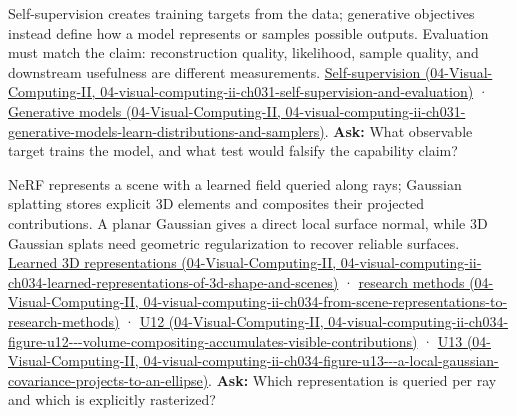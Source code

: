 Self-supervision creates training targets from the data; generative objectives instead define how a model represents or samples possible outputs. Evaluation must match the claim: reconstruction quality, likelihood, sample quality, and downstream usefulness are different measurements. \href{../04-Visual-Computing-II/main.pdf\#nameddest=04-visual-computing-ii-ch031-self-supervision-and-evaluation}{Self-supervision (04-Visual-Computing-II, 04-visual-computing-ii-ch031-self-supervision-and-evaluation)} · \href{../04-Visual-Computing-II/main.pdf\#nameddest=04-visual-computing-ii-ch031-generative-models-learn-distributions-and-samplers}{Generative models (04-Visual-Computing-II, 04-visual-computing-ii-ch031-generative-models-learn-distributions-and-samplers)}. \textbf{Ask:} What observable target trains the model, and what test would falsify the capability claim?

NeRF represents a scene with a learned field queried along rays; Gaussian splatting stores explicit 3D elements and composites their projected contributions. A planar Gaussian gives a direct local surface normal, while 3D Gaussian splats need geometric regularization to recover reliable surfaces. \href{../04-Visual-Computing-II/main.pdf\#nameddest=04-visual-computing-ii-ch034-learned-representations-of-3d-shape-and-scenes}{Learned 3D representations (04-Visual-Computing-II, 04-visual-computing-ii-ch034-learned-representations-of-3d-shape-and-scenes)} · \href{../04-Visual-Computing-II/main.pdf\#nameddest=04-visual-computing-ii-ch034-from-scene-representations-to-research-methods}{research methods (04-Visual-Computing-II, 04-visual-computing-ii-ch034-from-scene-representations-to-research-methods)} · \href{../04-Visual-Computing-II/main.pdf\#nameddest=04-visual-computing-ii-ch034-figure-u12---volume-compositing-accumulates-visible-contributions}{U12 (04-Visual-Computing-II, 04-visual-computing-ii-ch034-figure-u12-\/-\/-volume-compositing-accumulates-visible-contributions)} · \href{../04-Visual-Computing-II/main.pdf\#nameddest=04-visual-computing-ii-ch034-figure-u13---a-local-gaussian-covariance-projects-to-an-ellipse}{U13 (04-Visual-Computing-II, 04-visual-computing-ii-ch034-figure-u13-\/-\/-a-local-gaussian-covariance-projects-to-an-ellipse)}. \textbf{Ask:} Which representation is queried per ray and which is explicitly rasterized?

